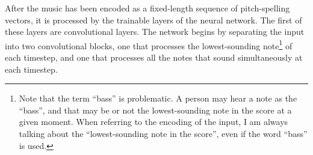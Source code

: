 
After the music has been encoded as a fixed-length sequence
of pitch-spelling vectors, it is processed by the trainable
layers of the neural network. The first of these layers are
convolutional layers. The network begins by separating the
input into two convolutional blocks, one that processes the
lowest-sounding note\footnote{Note that the term ``bass'' is
problematic. A person may hear a note as the ``bass'', and
that may be or not the lowest-sounding note in the score at
a given moment. When referring to the encoding of the input,
I am always talking about the ``lowest-sounding note in the
score'', even if the word ``bass'' is used.} of each
timestep, and one that processes all the notes that sound
simultaneously at each timestep.

